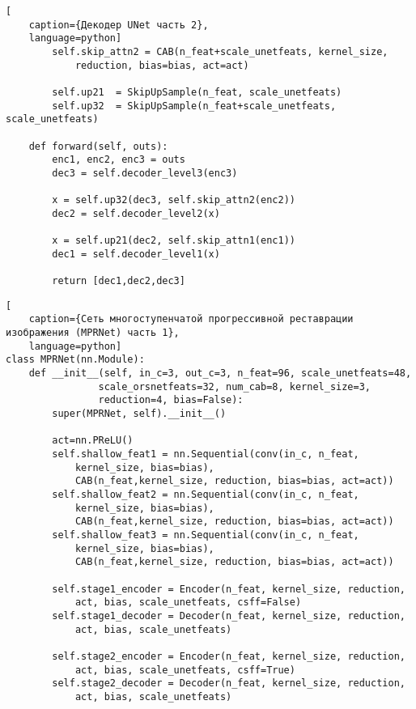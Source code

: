 \begin{lstlisting}[
    caption={Декодер UNet часть 2},
    language=python]
        self.skip_attn2 = CAB(n_feat+scale_unetfeats, kernel_size, 
            reduction, bias=bias, act=act)

        self.up21  = SkipUpSample(n_feat, scale_unetfeats)
        self.up32  = SkipUpSample(n_feat+scale_unetfeats, scale_unetfeats)

    def forward(self, outs):
        enc1, enc2, enc3 = outs
        dec3 = self.decoder_level3(enc3)

        x = self.up32(dec3, self.skip_attn2(enc2))
        dec2 = self.decoder_level2(x)

        x = self.up21(dec2, self.skip_attn1(enc1))
        dec1 = self.decoder_level1(x)

        return [dec1,dec2,dec3]
\end{lstlisting}

\begin{lstlisting}[
    caption={Сеть многоступенчатой прогрессивной реставрации изображения (MPRNet) часть 1},
    language=python]
class MPRNet(nn.Module):
    def __init__(self, in_c=3, out_c=3, n_feat=96, scale_unetfeats=48, 
                scale_orsnetfeats=32, num_cab=8, kernel_size=3, 
                reduction=4, bias=False):
        super(MPRNet, self).__init__()

        act=nn.PReLU()
        self.shallow_feat1 = nn.Sequential(conv(in_c, n_feat, 
            kernel_size, bias=bias), 
            CAB(n_feat,kernel_size, reduction, bias=bias, act=act))
        self.shallow_feat2 = nn.Sequential(conv(in_c, n_feat, 
            kernel_size, bias=bias), 
            CAB(n_feat,kernel_size, reduction, bias=bias, act=act))
        self.shallow_feat3 = nn.Sequential(conv(in_c, n_feat, 
            kernel_size, bias=bias), 
            CAB(n_feat,kernel_size, reduction, bias=bias, act=act))

        self.stage1_encoder = Encoder(n_feat, kernel_size, reduction, 
            act, bias, scale_unetfeats, csff=False)
        self.stage1_decoder = Decoder(n_feat, kernel_size, reduction, 
            act, bias, scale_unetfeats)

        self.stage2_encoder = Encoder(n_feat, kernel_size, reduction, 
            act, bias, scale_unetfeats, csff=True)
        self.stage2_decoder = Decoder(n_feat, kernel_size, reduction, 
            act, bias, scale_unetfeats)
\end{lstlisting}

